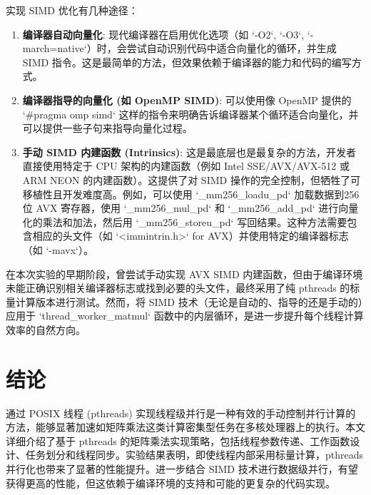 \documentclass{article}
\begin{document}
实现 SIMD 优化有几种途径：
\begin{enumerate}
    \item \textbf{编译器自动向量化}: 现代编译器在启用优化选项（如 `-O2`, `-O3`, `-march=native`）时，会尝试自动识别代码中适合向量化的循环，并生成 SIMD 指令。这是最简单的方法，但效果依赖于编译器的能力和代码的编写方式。
    \item \textbf{编译器指导的向量化 (如 OpenMP SIMD)}: 可以使用像 OpenMP 提供的 `\#pragma omp simd` 这样的指令来明确告诉编译器某个循环适合向量化，并可以提供一些子句来指导向量化过程。
    \item \textbf{手动 SIMD 内建函数 (Intrinsics)}: 这是最底层也是最复杂的方法，开发者直接使用特定于 CPU 架构的内建函数（例如 Intel SSE/AVX/AVX-512 或 ARM NEON 的内建函数）。这提供了对 SIMD 操作的完全控制，但牺牲了可移植性且开发难度高。例如，可以使用 `_mm256_loadu_pd` 加载数据到256位 AVX 寄存器，使用 `_mm256_mul_pd` 和 `_mm256_add_pd` 进行向量化的乘法和加法，然后用 `_mm256_storeu_pd` 写回结果。这种方法需要包含相应的头文件（如 `<immintrin.h>` for AVX）并使用特定的编译器标志（如 `-mavx`）。
\end{enumerate}
在本次实验的早期阶段，曾尝试手动实现 AVX SIMD 内建函数，但由于编译环境未能正确识别相关编译器标志或找到必要的头文件，最终采用了纯 pthreads 的标量计算版本进行测试。然而，将 SIMD 技术（无论是自动的、指导的还是手动的）应用于 `thread_worker_matmul` 函数中的内层循环，是进一步提升每个线程计算效率的自然方向。

\section{结论}
通过 POSIX 线程 (pthreads) 实现线程级并行是一种有效的手动控制并行计算的方法，能够显著加速如矩阵乘法这类计算密集型任务在多核处理器上的执行。本文详细介绍了基于 pthreads 的矩阵乘法实现策略，包括线程参数传递、工作函数设计、任务划分和线程同步。实验结果表明，即使线程内部采用标量计算，pthreads 并行化也带来了显著的性能提升。进一步结合 SIMD 技术进行数据级并行，有望获得更高的性能，但这依赖于编译环境的支持和可能的更复杂的代码实现。
\end{document}
